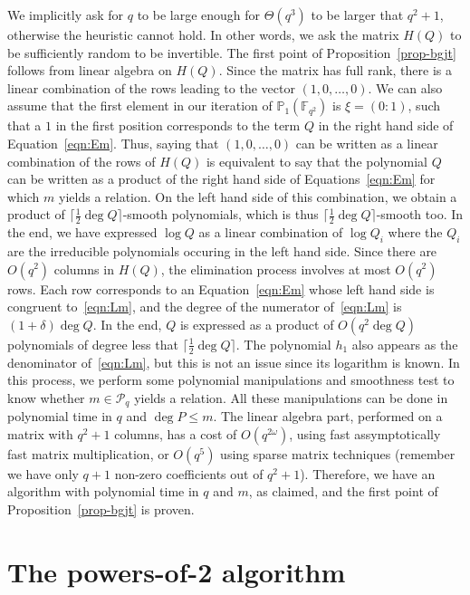 \documentclass[a4paper,11pt]{article}
\theoremstyle{break}
\theoremstyle{sc}
\theoremstyle{definition}
\theoremstyle{remark}
\begin{document}
We implicitly ask for $q$ to be large enough for $\Theta(q^3)$ to be larger that
$q^2+1$, otherwise the heuristic cannot hold. In other words, we ask the matrix
$H(Q)$ to be sufficiently random to be invertible. The first point of
Proposition~\ref{prop-bgjt} follows from linear algebra on $H(Q)$. Since the
matrix has full rank, there is a linear combination of the rows leading to the
vector $(1, 0, \dots, 0)$. We can also assume that the first element in our
iteration of $\mathbb{P}_1(\mathbb{F}_{q^2})$ is $\xi=(0:1)$, such that a $1$ in
the first position corresponds to the term $Q$ in the right hand side of
Equation~\eqref{eqn:Em}. Thus, saying that $(1, 0, \dots, 0)$ can be written as
a linear combination of the rows of $H(Q)$ is equivalent to say that the
polynomial $Q$ can be written as a product of the right hand side of
Equations~\eqref{eqn:Em} for which $m$ yields a relation. On the left hand side
of this combination, we obtain a product of $\lceil\frac{1}{2}\deg Q\rceil$-smooth
polynomials, which is thus $\lceil\frac{1}{2}\deg Q\rceil$-smooth too. In the end, we
have expressed $\log Q$ as a linear combination of $\log Q_i$ where the $Q_i$
are the irreducible polynomials occuring in the left hand side. Since there are
$O(q^2)$ columns in $H(Q)$, the elimination process involves at most
$O(q^2)$ rows. Each row corresponds to an Equation~\eqref{eqn:Em} whose left
hand side is congruent to~\eqref{eqn:Lm}, and the degree of the numerator
of~\eqref{eqn:Lm} is $(1+\delta)\deg Q$. In the end, $Q$ is expressed as a product
of $O(q^2\deg Q)$ polynomials of degree less that $\lceil\frac{1}{2}\deg
Q\rceil$. The polynomial $h_1$ also appears as the denominator
of~\eqref{eqn:Lm}, but this is not an issue since its logarithm is known. In
this process, we perform some polynomial manipulations and smoothness test to
know whether $m\in\mathcal P_q$ yields a relation. All these manipulations can
be done in polynomial time in $q$ and $\deg P\leq m$. The linear algebra part,
performed on a matrix with $q^2+1$ columns, has a cost of $O(q^{2\omega})$,
using fast assymptotically fast matrix multiplication, or $O(q^5)$ using sparse
matrix techniques (remember we have only $q+1$ non-zero coefficients out of
$q^2+1$). Therefore, we have an algorithm with polynomial time in $q$ and $m$, as
claimed, and the first point of Proposition~\ref{prop-bgjt} is proven.

\section{The powers-of-2 algorithm}
\label{powers-of-2}
\end{document}
